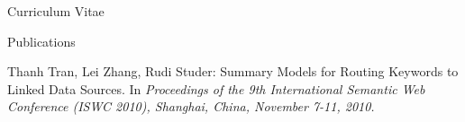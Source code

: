 \begin{cv}{\centerline{\LARGE Curriculum Vitae}}
\begin{cvlist}{Publications}
\begin{list}{}{\leftmargin=-1em}
    \item Thanh Tran, Lei Zhang, Rudi Studer: Summary Models for Routing Keywords to Linked Data Sources. In \emph{Proceedings of the 9th International Semantic Web Conference (ISWC 2010), Shanghai, China, November 7-11, 2010.}
 

%    
%    
%    
%    
%    
%    

\end{list}
\end{cvlist}
\end{cv}
